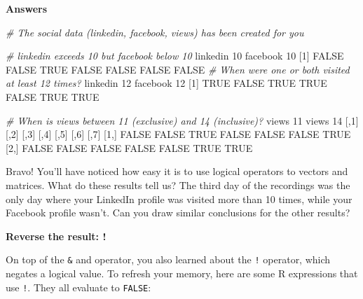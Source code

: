 \documentclass[]{article}
\newcommand{\hlnum}[1]{\textcolor[rgb]{0.816,0.125,0.439}{#1}}%
\newcommand{\hlstr}[1]{\textcolor[rgb]{0.251,0.627,0.251}{#1}}%
\newcommand{\hlcom}[1]{\textcolor[rgb]{0.502,0.502,0.502}{\textit{#1}}}%
\newcommand{\hlstd}[1]{\textcolor[rgb]{0.251,0.251,0.251}{#1}}%
\newenvironment{Shaded}{\begin{myshaded}}{\end{myshaded}}
\newcommand{\DecValTok}[1]{\hlnum{#1}}
\newcommand{\StringTok}[1]{\hlstr{#1}}
\newcommand{\CommentTok}[1]{\hlcom{#1}}
\newcommand{\OtherTok}[1]{{#1}}
\newcommand{\NormalTok}[1]{\hlstd{#1}}
\begin{document}
\textbf{Answers}

\begin{Shaded}
\begin{Highlighting}[]
\CommentTok{# The social data (linkedin, facebook, views) has been created for you}

\CommentTok{# linkedin exceeds 10 but facebook below 10}
\NormalTok{linkedin }\OperatorTok{>}\StringTok{ }\DecValTok{10} \OperatorTok{&}\StringTok{ }\NormalTok{facebook }\OperatorTok{<}\StringTok{ }\DecValTok{10}
\NormalTok{   [}\DecValTok{1}\NormalTok{] }\OtherTok{FALSE} \OtherTok{FALSE}  \OtherTok{TRUE} \OtherTok{FALSE} \OtherTok{FALSE} \OtherTok{FALSE} \OtherTok{FALSE}
\CommentTok{# When were one or both visited at least 12 times?}
\NormalTok{linkedin }\OperatorTok{>=}\StringTok{ }\DecValTok{12} \OperatorTok{|}\StringTok{ }\NormalTok{facebook }\OperatorTok{>=}\StringTok{ }\DecValTok{12}
\NormalTok{   [}\DecValTok{1}\NormalTok{]  }\OtherTok{TRUE} \OtherTok{FALSE}  \OtherTok{TRUE}  \OtherTok{TRUE} \OtherTok{FALSE}  \OtherTok{TRUE}  \OtherTok{TRUE}

\CommentTok{# When is views between 11 (exclusive) and 14 (inclusive)?}
\NormalTok{views }\OperatorTok{>}\StringTok{ }\DecValTok{11} \OperatorTok{&}\StringTok{ }\NormalTok{views }\OperatorTok{<=}\StringTok{ }\DecValTok{14}
\NormalTok{         [,}\DecValTok{1}\NormalTok{]  [,}\DecValTok{2}\NormalTok{]  [,}\DecValTok{3}\NormalTok{]  [,}\DecValTok{4}\NormalTok{]  [,}\DecValTok{5}\NormalTok{]  [,}\DecValTok{6}\NormalTok{] [,}\DecValTok{7}\NormalTok{]}
\NormalTok{   [}\DecValTok{1}\NormalTok{,] }\OtherTok{FALSE} \OtherTok{FALSE}  \OtherTok{TRUE} \OtherTok{FALSE} \OtherTok{FALSE} \OtherTok{FALSE} \OtherTok{TRUE}
\NormalTok{   [}\DecValTok{2}\NormalTok{,] }\OtherTok{FALSE} \OtherTok{FALSE} \OtherTok{FALSE} \OtherTok{FALSE} \OtherTok{FALSE}  \OtherTok{TRUE} \OtherTok{TRUE}
\end{Highlighting}
\end{Shaded}

Bravo! You'll have noticed how easy it is to use logical operators to
vectors and matrices. What do these results tell us? The third day of
the recordings was the only day where your LinkedIn profile was visited
more than 10 times, while your Facebook profile wasn't. Can you draw
similar conclusions for the other results?

\textbf{Reverse the result: !}

On top of the \texttt{\&} and \texttt{\textbar{}} operator, you also
learned about the \texttt{!} operator, which negates a logical value. To
refresh your memory, here are some R expressions that use \texttt{!}.
They all evaluate to \texttt{FALSE}:
\end{document}
